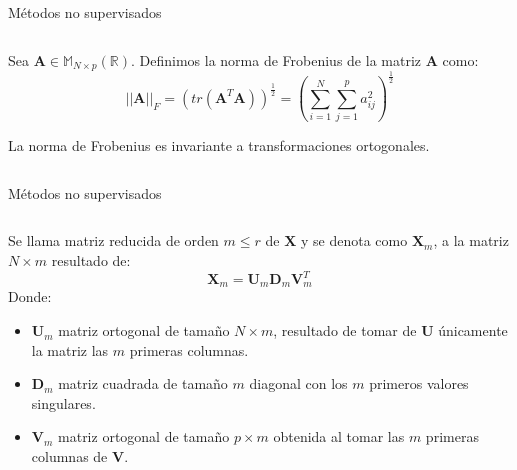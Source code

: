\begin{frame}{Métodos no supervisados}
\begin{columns}
\begin{column}{0.9\textwidth}

\begin{defi}
Sea $\textbf{A}\in \mathbb{M}_{N\times p}(\mathbb{R})$. Definimos la norma de Frobenius de la matriz \textbf{A} como:
\begin{equation}
||\textbf{A}||_F=(tr(\textbf{A}^T \textbf{A}))^{\frac{1}{2}}=\left(\sum_{i=1}^{N}\sum _{j=1}^{p}a_{ij}^2\right)^{\frac{1}{2}}
\end{equation}
\end{defi}
\begin{propo}
La norma de Frobenius es invariante a transformaciones ortogonales.
\end{propo}

\end{column}
\end{columns}
\end{frame}



\begin{frame}{Métodos no supervisados}
\begin{columns}
\begin{column}{0.9\textwidth}
\begin{defi}
Se llama matriz reducida de orden $m\leq r$ de $\textbf{X}$ y se denota como $\textbf{X}_m$, a la matriz $N\times m $ resultado de:
\begin{equation}
\textbf{X}_m=\textbf{U}_m\mathbf{D}_m\textbf{V}^T_m
\end{equation}
Donde:
\begin{itemize}
\item $\textbf{U}_m$ matriz ortogonal de tamaño $N \times m$, resultado de tomar de \textbf{U} únicamente la matriz las $m$ primeras columnas. 
\item $\mathbf{D}_m$  matriz cuadrada de tamaño $m$ diagonal con los $m$ primeros valores singulares. 
\item $\textbf{V}_m$ matriz ortogonal de tamaño $p \times m$ obtenida al tomar las $m$ primeras columnas de \textbf{V}.
\end{itemize}
\end{defi}
\end{column}
\end{columns}
\end{frame}

